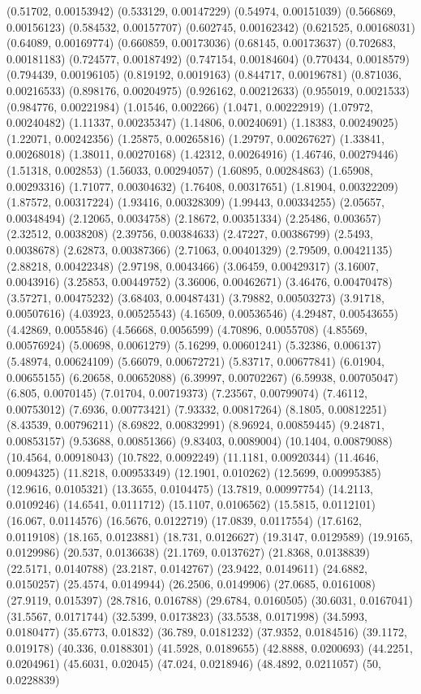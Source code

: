 {(0.51702, 0.00153942)
(0.533129, 0.00147229)
(0.54974, 0.00151039)
(0.566869, 0.00156123)
(0.584532, 0.00157707)
(0.602745, 0.00162342)
(0.621525, 0.00168031)
(0.64089, 0.00169774)
(0.660859, 0.00173036)
(0.68145, 0.00173637)
(0.702683, 0.00181183)
(0.724577, 0.00187492)
(0.747154, 0.00184604)
(0.770434, 0.0018579)
(0.794439, 0.00196105)
(0.819192, 0.0019163)
(0.844717, 0.00196781)
(0.871036, 0.00216533)
(0.898176, 0.00204975)
(0.926162, 0.00212633)
(0.955019, 0.0021533)
(0.984776, 0.00221984)
(1.01546, 0.002266)
(1.0471, 0.00222919)
(1.07972, 0.00240482)
(1.11337, 0.00235347)
(1.14806, 0.00240691)
(1.18383, 0.00249025)
(1.22071, 0.00242356)
(1.25875, 0.00265816)
(1.29797, 0.00267627)
(1.33841, 0.00268018)
(1.38011, 0.00270168)
(1.42312, 0.00264916)
(1.46746, 0.00279446)
(1.51318, 0.002853)
(1.56033, 0.00294057)
(1.60895, 0.00284863)
(1.65908, 0.00293316)
(1.71077, 0.00304632)
(1.76408, 0.00317651)
(1.81904, 0.00322209)
(1.87572, 0.00317224)
(1.93416, 0.00328309)
(1.99443, 0.00334255)
(2.05657, 0.00348494)
(2.12065, 0.0034758)
(2.18672, 0.00351334)
(2.25486, 0.003657)
(2.32512, 0.0038208)
(2.39756, 0.00384633)
(2.47227, 0.00386799)
(2.5493, 0.0038678)
(2.62873, 0.00387366)
(2.71063, 0.00401329)
(2.79509, 0.00421135)
(2.88218, 0.00422348)
(2.97198, 0.0043466)
(3.06459, 0.00429317)
(3.16007, 0.0043916)
(3.25853, 0.00449752)
(3.36006, 0.00462671)
(3.46476, 0.00470478)
(3.57271, 0.00475232)
(3.68403, 0.00487431)
(3.79882, 0.00503273)
(3.91718, 0.00507616)
(4.03923, 0.00525543)
(4.16509, 0.00536546)
(4.29487, 0.00543655)
(4.42869, 0.0055846)
(4.56668, 0.0056599)
(4.70896, 0.0055708)
(4.85569, 0.00576924)
(5.00698, 0.0061279)
(5.16299, 0.00601241)
(5.32386, 0.006137)
(5.48974, 0.00624109)
(5.66079, 0.00672721)
(5.83717, 0.00677841)
(6.01904, 0.00655155)
(6.20658, 0.00652088)
(6.39997, 0.00702267)
(6.59938, 0.00705047)
(6.805, 0.0070145)
(7.01704, 0.00719373)
(7.23567, 0.00799074)
(7.46112, 0.00753012)
(7.6936, 0.00773421)
(7.93332, 0.00817264)
(8.1805, 0.00812251)
(8.43539, 0.00796211)
(8.69822, 0.00832991)
(8.96924, 0.00859445)
(9.24871, 0.00853157)
(9.53688, 0.00851366)
(9.83403, 0.0089004)
(10.1404, 0.00879088)
(10.4564, 0.00918043)
(10.7822, 0.0092249)
(11.1181, 0.00920344)
(11.4646, 0.0094325)
(11.8218, 0.00953349)
(12.1901, 0.010262)
(12.5699, 0.00995385)
(12.9616, 0.0105321)
(13.3655, 0.0104475)
(13.7819, 0.00997754)
(14.2113, 0.0109246)
(14.6541, 0.0111712)
(15.1107, 0.0106562)
(15.5815, 0.0112101)
(16.067, 0.0114576)
(16.5676, 0.0122719)
(17.0839, 0.0117554)
(17.6162, 0.0119108)
(18.165, 0.0123881)
(18.731, 0.0126627)
(19.3147, 0.0129589)
(19.9165, 0.0129986)
(20.537, 0.0136638)
(21.1769, 0.0137627)
(21.8368, 0.0138839)
(22.5171, 0.0140788)
(23.2187, 0.0142767)
(23.9422, 0.0149611)
(24.6882, 0.0150257)
(25.4574, 0.0149944)
(26.2506, 0.0149906)
(27.0685, 0.0161008)
(27.9119, 0.015397)
(28.7816, 0.016788)
(29.6784, 0.0160505)
(30.6031, 0.0167041)
(31.5567, 0.0171744)
(32.5399, 0.0173823)
(33.5538, 0.0171998)
(34.5993, 0.0180477)
(35.6773, 0.01832)
(36.789, 0.0181232)
(37.9352, 0.0184516)
(39.1172, 0.019178)
(40.336, 0.0188301)
(41.5928, 0.0189655)
(42.8888, 0.0200693)
(44.2251, 0.0204961)
(45.6031, 0.02045)
(47.024, 0.0218946)
(48.4892, 0.0211057)
(50, 0.0228839)
}

